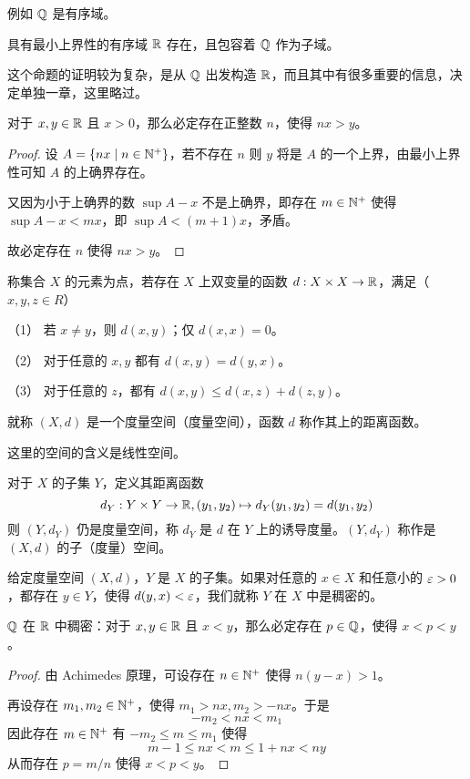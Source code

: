 例如 $\mathbb{Q}$ 是有序域。

\begin{theorem}[存在定理]
	具有最小上界性的有序域 $\mathbb{R}$ 存在，且包容着 $\mathbb{Q}$ 作为子域。
\end{theorem}

这个命题的证明较为复杂，是从 $\mathbb{Q}$ 出发构造 $\mathbb{R}$，而且其中有很多重要的信息，决定单独一章，这里略过。

\begin{theorem}[Achimedes 原理]
	对于 $x,y \in \mathbb{R}$ 且 $x>0$，那么必定存在正整数 $n$，使得 $nx>y$。
\end{theorem}
\begin{proof}
	设 $A = \{nx \mid n \in \mathbb{N}^+ \}$，若不存在 $n$ 则 $y$ 将是 $A$ 的一个上界，由最小上界性可知 $A$ 的上确界存在。

	又因为小于上确界的数 $\sup A-x$ 不是上确界，即存在 $m\in \mathbb{N}^+$ 使得 $\sup A -x <mx$，即 $\sup A < (m+1)x$，矛盾。

	故必定存在 $n$ 使得 $nx>y$。
\end{proof}

\begin{definition}[度量空间]
	称集合 $X$ 的元素为点，若存在 $X$ 上双变量的函数 $d:X \times X \to \mathbb{R}$，满足（$x,y,z\in R$）

	（1） 若 $x\ne y$，则 $d(x,y)$；仅 $d(x,x)=0$。

	（2） 对于任意的 $x,y$ 都有 $d(x,y) = d(y,x)$。

	（3） 对于任意的 $z$，都有 $d(x,y) \leqslant d(x,z) + d(z,y)$。

	就称 $(X,d)$ 是一个度量空间（度量空间），函数 $d$ 称作其上的距离函数。
\end{definition}

这里的空间的含义是线性空间。

对于 $X$ 的子集 $Y$，定义其距离函数
$$d_Y: Y \times Y \to \mathbb{R}, (y_1,y_2) \mapsto d_Y(y_1,y_2)=d(y_1,y_2)$$
则 $(Y,d_Y)$ 仍是度量空间，称 $d_Y$ 是 $d$ 在 $Y$ 上的诱导度量。$(Y,d_Y)$ 称作是 $(X,d)$ 的子（度量）空间。

\begin{definition}[稠密性]
	给定度量空间 $(X,d)$，$Y$ 是 $X$ 的子集。如果对任意的 $x\in X$ 和任意小的 $\varepsilon>0$，都存在 $y\in Y$，使得 $d(y,x)<\varepsilon$，我们就称 $Y$ 在 $X$ 中是稠密的。
\end{definition}

\begin{example}
	$\mathbb{Q}$ 在 $\mathbb{R}$ 中稠密：对于 $x,y \in \mathbb{R}$ 且 $x<y$，那么必定存在 $p\in\mathbb{Q}$，使得 $x<p<y$。
\end{example}
\begin{proof}
	由 Achimedes 原理，可设存在 $n\in \mathbb{N}^+$ 使得 $n(y-x)>1$。

	再设存在 $m_1,m_2\in \mathbb{N}^+$，使得 $m_1>nx,m_2>-nx$。于是
	$$-m_2<nx<m_1$$
	因此存在 $m\in \mathbb{N}^+$ 有 $-m_2\leqslant m \leqslant m_1$ 使得
	$$m-1\leqslant nx < m \leqslant 1+nx < ny$$
	从而存在 $p=m/n$ 使得 $x<p<y$。
\end{proof}



